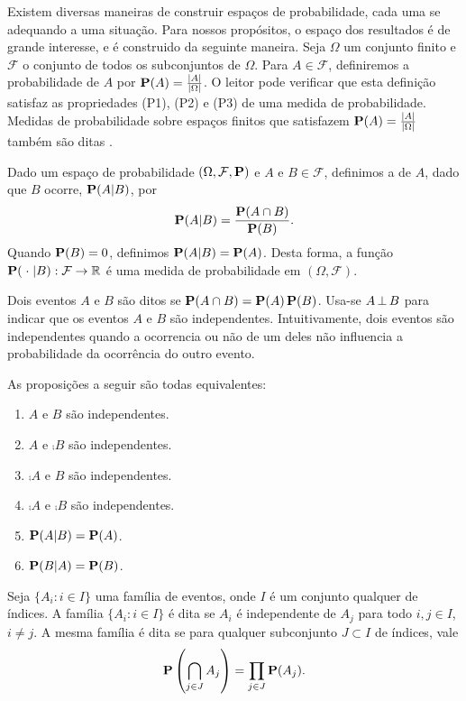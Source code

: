 Existem diversas maneiras de construir espaços de probabilidade, cada uma se adequando a uma situação. Para nossos propósitos, o espaço dos resultados  é de grande interesse, e é construido da seguinte maneira.
Seja $\Omega$ um conjunto finito e $\mathcal{F}$ o conjunto de todos os subconjuntos de $\Omega$. Para $A \in \mathcal{F}$, definiremos a probabilidade de $A$ por $\operatorname{\mathbf{P}}(A) = \frac{\left | A \right |}{\left | \Omega \right |}$. O leitor pode verificar que esta definição satisfaz as propriedades (P1), (P2) e (P3) de uma medida de probabilidade. Medidas de probabilidade sobre espaços finitos que satisfazem $\operatorname{\mathbf{P}}(A) = \frac{\left | A \right |}{\left | \Omega \right |}$ também são ditas .

Dado um espaço de probabilidade $(\Omega, \mathcal{F}, \operatorname{\mathbf{P}})$ e $A$ e $B \in \mathcal{F}$, definimos a  de $A$, dado que $B$ ocorre, $\operatorname{\mathbf{P}}(A | B)$, por
\[ \operatorname{\mathbf{P}}(A|B) = \frac{\operatorname{\mathbf{P}}(A \cap B)}{\operatorname{\mathbf{P}}(B)}. \]
Quando $\operatorname{\mathbf{P}}(B) = 0$, definimos $\operatorname{\mathbf{P}}(A|B) = \operatorname{\mathbf{P}}(A)$. Desta forma, a função $\operatorname{\mathbf{P}}(\; \cdot \;| B) : \mathcal{F} \to \mathbb{R}$ é uma medida de probabilidade em $(\Omega, \mathcal{F})$.

Dois eventos $A$ e $B$ são ditos  se $\operatorname{\mathbf{P}}(A \cap B) = \operatorname{\mathbf{P}}(A) \operatorname{\mathbf{P}}(B)$. Usa-se $A \operatorname{\perp} B$ para indicar que os eventos $A$ e $B$ são independentes. Intuitivamente, dois eventos são independentes quando a ocorrencia ou não de um deles não influencia a probabilidade da ocorrência do outro evento.

As proposições a seguir são todas equivalentes:
\begin{enumerate}[label=\arabic*.,itemindent=*]
  \item $A$ e $B$ são independentes.
  \item $A$ e $\comp{B}$ são independentes.
  \item $\comp{A}$ e $B$ são independentes.
  \item $\comp{A}$ e $\comp{B}$ são independentes.
  \item $\operatorname{\mathbf{P}}(A|B) = \operatorname{\mathbf{P}}(A)$.
  \item $\operatorname{\mathbf{P}}(B|A) = \operatorname{\mathbf{P}}(B)$.
\end{enumerate}

Seja $\{ A_i : i \in I\}$ uma família de eventos, onde $I$ é um conjunto qualquer de índices. A família $\{ A_i : i \in I\}$ é dita  se $A_i$ é independente de $A_j$ para todo $i,j \in I$, $i \neq j$. A mesma família é dita  se para qualquer subconjunto $J \subset I$ de índices, vale
\[ \operatorname{\mathbf{P}}\left(\bigcap_{j \in J} A_j \right) = \prod_{j \in J}\operatorname{\mathbf{P}}(A_j).\]

